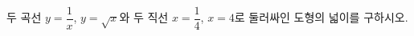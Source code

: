 \hspace*{2mm}\begin{minipage}[t]{\dimexpr\linewidth-2mm\relax}\vspace{0pt}
두 곡선 $y=\dfrac{1}{x}$, $y=\sqrt{x}$와 두 직선 $x=\dfrac{1}{4}$, $x=4$로 둘러싸인 도형의 넓이를 구하시오.\end{minipage}
